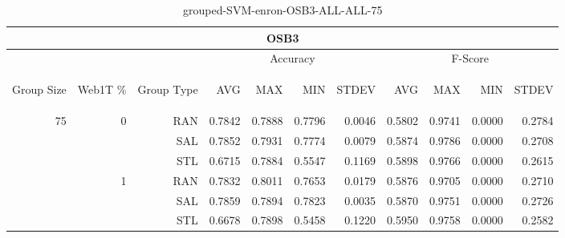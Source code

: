 \begin{center}
\begin{table}[htbp] 
 \begin{center}
\begin{tabular}{ | r | r | r | r | r | r | r | r | r | r | r |}
\hline
\multicolumn{11}{|c|}{OSB3}\\
\hline
 & & & \multicolumn{4}{|c|}{Accuracy} & \multicolumn{4}{|c|}{F-Score}\\ \cline{4-11}
\begin{sideways}Group Size\end{sideways} & \begin{sideways}Web1T \%\end{sideways} & \begin{sideways}Group Type\end{sideways} & \begin{sideways}AVG\end{sideways} & \begin{sideways}MAX\end{sideways} & \begin{sideways}MIN\end{sideways} & \begin{sideways}STDEV\end{sideways} & \begin{sideways}AVG\end{sideways} & \begin{sideways}MAX\end{sideways} & \begin{sideways}MIN\end{sideways} & \begin{sideways}STDEV\end{sideways}\\
\hline
\multirow{6}{*}{75}
 & \multirow{3}{*}{0} & RAN & 0.7842 & 0.7888 & 0.7796 & 0.0046 & 0.5802 & 0.9741 & 0.0000 & 0.2784\\ \cline{3-11}
 &   & SAL & 0.7852 & 0.7931 & 0.7774 & 0.0079 & 0.5874 & 0.9786 & 0.0000 & 0.2708\\ \cline{3-11}
 &   & STL & 0.6715 & 0.7884 & 0.5547 & 0.1169 & 0.5898 & 0.9766 & 0.0000 & 0.2615\\ \cline{2-11}
 & \multirow{3}{*}{1} & RAN & 0.7832 & 0.8011 & 0.7653 & 0.0179 & 0.5876 & 0.9705 & 0.0000 & 0.2710\\ \cline{3-11}
 &   & SAL & 0.7859 & 0.7894 & 0.7823 & 0.0035 & 0.5870 & 0.9751 & 0.0000 & 0.2726\\ \cline{3-11}
 &   & STL & 0.6678 & 0.7898 & 0.5458 & 0.1220 & 0.5950 & 0.9758 & 0.0000 & 0.2582\\ \cline{2-11}
\hline
\end{tabular}
\caption{grouped-SVM-enron-OSB3-ALL-ALL-75}
\end{center}
 \end{table}
\end{center}

